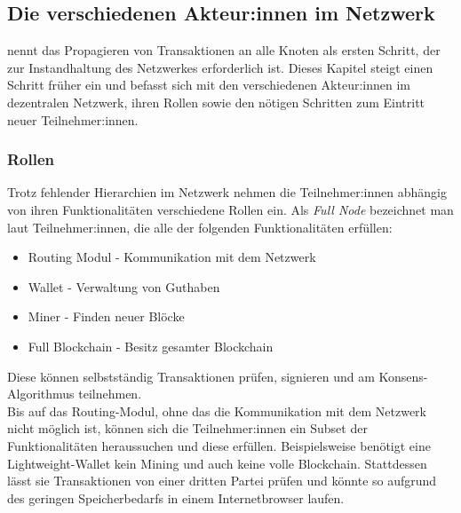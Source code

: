 \subsection{Die verschiedenen Akteur:innen im Netzwerk}
\cite{nakamoto_whitepaper_2008} nennt das Propagieren von Transaktionen an alle Knoten als ersten Schritt, der zur Instandhaltung des Netzwerkes erforderlich ist. Dieses Kapitel steigt einen Schritt früher ein und befasst sich mit den verschiedenen Akteur:innen im dezentralen Netzwerk, ihren Rollen sowie den nötigen Schritten zum Eintritt neuer Teilnehmer:innen.
\subsubsection{Rollen}
Trotz fehlender Hierarchien im Netzwerk nehmen die Teilnehmer:innen abhängig von ihren Funktionalitäten verschiedene Rollen ein. Als \emph{Full Node} bezeichnet man laut \cite[S. 169/170]{antanopoulos_2014} Teilnehmer:innen, die alle der folgenden Funktionalitäten erfüllen:
\begin{itemize}
	\item Routing Modul - Kommunikation mit dem Netzwerk
	\item Wallet - Verwaltung von Guthaben
	\item Miner - Finden neuer Blöcke
	\item Full Blockchain - Besitz gesamter Blockchain
\end{itemize}
Diese können selbstständig Transaktionen prüfen, signieren und am Konsens-Algorithmus teilnehmen.\\

Bis auf das Routing-Modul, ohne das die Kommunikation mit dem Netzwerk nicht möglich ist, können sich die Teilnehmer:innen ein Subset der Funktionalitäten heraussuchen und diese erfüllen. 
Beispielsweise benötigt eine Lightweight-Wallet kein Mining und auch keine volle Blockchain. 
Stattdessen lässt sie Transaktionen von einer dritten Partei prüfen und könnte so aufgrund des geringen Speicherbedarfs in einem Internetbrowser laufen.

